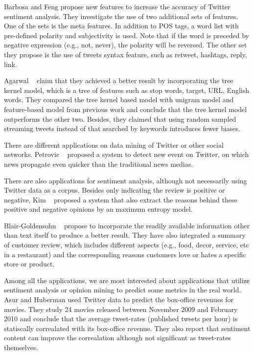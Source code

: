 \documentclass[12pt]{article}
\begin{document}
Barbosa and Feng \cite{Barbosa:10} propose new features to increase the accuracy of Twitter sentiment analysis. They investigate the use of two additional sets of features. One of the sets is the meta features. In addition to POS tags, a word list with pre-defined polarity and subjectivity is used. Note that if the word is preceded by negative expression (e.g., not, never), the polarity will be reversed. The other set they propose is the use of tweets syntax feature, such as retweet, hashtags, reply, link.

Agarwal \etal~\cite{Agarwal:11} claim that they achieved a better result by incorporating the tree kernel model, which is a tree of features such as stop words, target, URL, English words. They compared the tree kernel based model with unigram model and feature-based model from previous work and conclude that the tree kernel model outperforms the other two. Besides, they claimed that using random sampled streaming tweets instead of that searched by keywords introduces fewer biases.

There are different applications on data mining of Twitter or other social networks. Petrovic \etal~\cite{Petrovic:10} proposed a system to detect new event on Twitter, on which news propagate even quicker than the traditional news medias.

There are also applications for sentiment analysis, although not necessarily using Twitter data as a corpus. Besides only indicating the review is positive or negative, Kim \etal~\cite{Kim:06} proposed a system that also extract the reasons behind these positive and negative opinions by an maximum entropy model.

Blair-Goldensohn \etal~\cite{Blair:08} propose to incorporate the readily available information other than text itself to produce a better result. They have also integrated a summary of customer review, which includes different aspects (e.g., food, decor, service, etc in a restaurant) and the corresponding reasons customers love or hates a specific store or product.

Among all the applications, we are most interested about applications that utilize sentiment analysis or opinion mining to predict some metrics in the real world. Asur and Huberman \cite{Asur:10} used Twitter data to predict the box-office revenues for movies. They study 24 movies released between November 2009 and February 2010 and conclude that the average tweet-rates (published tweets per hour) is statiscally correalated with its box-office revenue. They also report that sentiment content can improve the correalation although not significant as tweet-rates themselves.
\end{document}
